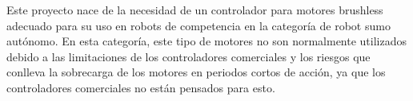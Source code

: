 \documentclass[11pt]{report}
\begin{document}
Este proyecto nace de la necesidad de un controlador para motores brushless adecuado para su uso en robots de competencia en la categoría de robot sumo autónomo. En esta categoría, este tipo de motores no son normalmente utilizados debido a las limitaciones de los controladores comerciales y los riesgos que conlleva la sobrecarga de los motores en periodos cortos de acción, ya que los controladores comerciales no están pensados para esto.

\end{document}
